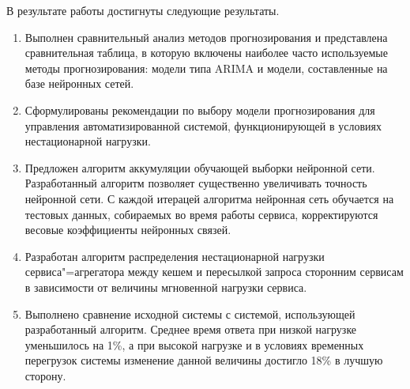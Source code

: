В результате работы достигнуты следующие результаты.
\begin{enumerate}
   \item Выполнен сравнительный анализ методов прогнозирования и представлена
      сравнительная таблица, в которую включены наиболее часто используемые методы
      прогнозирования: модели типа ARIMA и модели, составленные на базе нейронных сетей.
   \item Сформулированы рекомендации по выбору модели прогнозирования для управления
      автоматизированной системой, функционирующей в условиях нестационарной нагрузки.
   \item Предложен алгоритм аккумуляции обучающей выборки нейронной 
      сети. Разработанный алгоритм позволяет существенно увеличивать точность нейронной сети.
      С каждой итерацей алгоритма нейронная сеть обучается на тестовых данных, собираемых 
      во время работы сервиса, корректируются весовые коэффициенты нейронных связей.
   \item Разработан алгоритм распределения нестационарной нагрузки сервиса"=агрегатора
      между кешем и пересылкой запроса сторонним сервисам в зависимости от величины мгновенной
      нагрузки сервиса. 
   \item Выполнено сравнение исходной системы с системой, использующей разработанный 
      алгоритм. Среднее время ответа при низкой нагрузке уменьшилось на 1\%, а
      при высокой нагрузке и в условиях временных перегрузок системы изменение данной величины
      достигло 18\% в лучшую сторону.
\end{enumerate}
